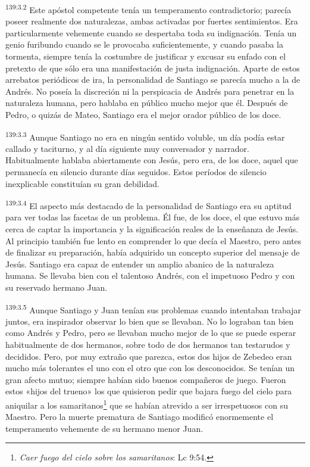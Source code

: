 \par 
\textsuperscript{139:3.2} Este apóstol competente tenía un temperamento contradictorio; parecía poseer realmente dos naturalezas, ambas activadas por fuertes sentimientos. Era particularmente vehemente cuando se despertaba toda su indignación. Tenía un genio furibundo cuando se le provocaba suficientemente, y cuando pasaba la tormenta, siempre tenía la costumbre de justificar y excusar su enfado con el pretexto de que sólo era una manifestación de justa indignación. Aparte de estos arrebatos periódicos de ira, la personalidad de Santiago se parecía mucho a la de Andrés. No poseía la discreción ni la perspicacia de Andrés para penetrar en la naturaleza humana, pero hablaba en público mucho mejor que él. Después de Pedro, o quizás de Mateo, Santiago era el mejor orador público de los doce.

\par 
\textsuperscript{139:3.3} Aunque Santiago no era en ningún sentido voluble, un día podía estar callado y taciturno, y al día siguiente muy conversador y narrador. Habitualmente hablaba abiertamente con Jesús, pero era, de los doce, aquel que permanecía en silencio durante días seguidos. Estos períodos de silencio inexplicable constituían su gran debilidad.

\par 
\textsuperscript{139:3.4} El aspecto más destacado de la personalidad de Santiago era su aptitud para ver todas las facetas de un problema. Él fue, de los doce, el que estuvo más cerca de captar la importancia y la significación reales de la enseñanza de Jesús. Al principio también fue lento en comprender lo que decía el Maestro, pero antes de finalizar su preparación, había adquirido un concepto superior del mensaje de Jesús. Santiago era capaz de entender un amplio abanico de la naturaleza humana. Se llevaba bien con el talentoso Andrés, con el impetuoso Pedro y con su reservado hermano Juan.

\par 
\textsuperscript{139:3.5} Aunque Santiago y Juan tenían sus problemas cuando intentaban trabajar juntos, era inspirador observar lo bien que se llevaban. No lo lograban tan bien como Andrés y Pedro, pero se llevaban mucho mejor de lo que se puede esperar habitualmente de dos hermanos, sobre todo de dos hermanos tan testarudos y decididos. Pero, por muy extraño que parezca, estos dos hijos de Zebedeo eran mucho más tolerantes el uno con el otro que con los desconocidos. Se tenían un gran afecto mutuo; siempre habían sido buenos compañeros de juego. Fueron estos «hijos del trueno» los que quisieron pedir que bajara fuego del cielo para aniquilar a los samaritanos\footnote{\textit{Caer fuego del cielo sobre los samaritanos}: Lc 9:54.} que se habían atrevido a ser irrespetuosos con su Maestro. Pero la muerte prematura de Santiago modificó enormemente el temperamento vehemente de su hermano menor Juan.

